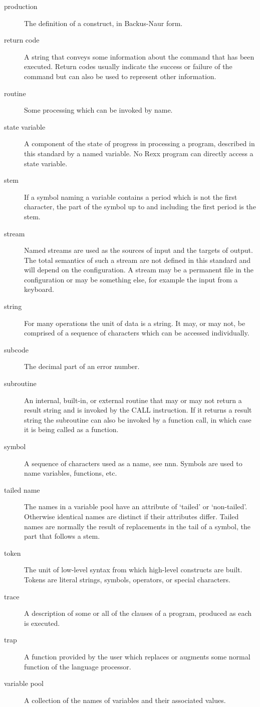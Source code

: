 \begin{description}
\item[production]
The definition of a construct, in Backus-Naur form.
\item[return code]
A string that conveys some information about the command that has been
executed. Return codes usually indicate the success or failure of the
command but can also be used to represent other information.
\item[routine]
Some processing which can be invoked by name.
\item[state variable]
A component of the state of progress in processing a program, described
in this standard by a named variable. No Rexx program can directly
access a state variable.
\item[stem]
If a symbol naming a variable contains a period which is not the first
character, the part of the symbol up to and including the first period
is the stem.
\item[stream]
Named streams are used as the sources of input and the targets of
output. The total semantics of such a stream are not defined in this
standard and will depend on the configuration. A stream may be a
permanent file in the configuration or may be something else, for
example the input from a keyboard.
\item[string]
For many operations the unit of data is a string. It may, or may not, be
comprised of a sequence of characters which can be accessed
individually.
\item[subcode]
The decimal part of an error number.
\item[subroutine]
An internal, built-in, or external routine that may or may not return a
result string and is invoked by the CALL instruction. If it returns a
result string the subroutine can also be invoked by a function call, in
which case it is being called as a function.
\item[symbol]
A sequence of characters used as a name, see nnn. Symbols are used to
name variables, functions, etc.
\item[tailed name]
The names in a variable pool have an attribute of `tailed' or
`non-tailed'. Otherwise identical names are distinct if their attributes
differ. Tailed names are normally the result of replacements in the tail
of a symbol, the part that follows a stem.
\item[token]
The unit of low-level syntax from which high-level constructs are built.
Tokens are literal strings, symbols, operators, or special characters.
\item[trace]
A description of some or all of the clauses of a program, produced as
each is executed.
\item[trap]
A function provided by the user which replaces or augments some normal
function of the language processor.
\item[variable pool]
A collection of the names of variables and their associated values.
\end{description}

